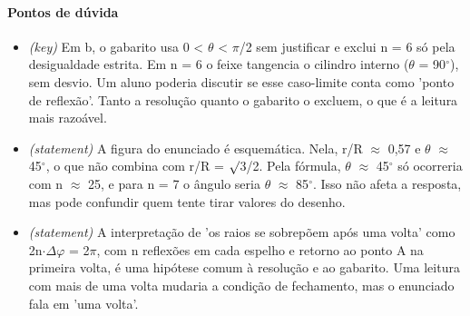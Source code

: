 \documentclass{article}%
\begin{document}
\paragraph{Pontos de dúvida}%
\begin{itemize}%
\item%
\textit{(key)} Em b, o gabarito usa 0 < $\theta$ < $\pi$/2 sem justificar e exclui n = 6 só pela desigualdade estrita. Em n = 6 o feixe tangencia o cilindro interno ($\theta$ = 90$^\circ$), sem desvio. Um aluno poderia discutir se esse caso{-}limite conta como 'ponto de reflexão'. Tanto a resolução quanto o gabarito o excluem, o que é a leitura mais razoável.%
\item%
\textit{(statement)} A figura do enunciado é esquemática. Nela, r/R $\approx$ 0,57 e $\theta$ $\approx$ 45$^\circ$, o que não combina com r/R = $\surd$3/2. Pela fórmula, $\theta$ $\approx$ 45$^\circ$ só ocorreria com n $\approx$ 25, e para n = 7 o ângulo seria $\theta$ $\approx$ 85$^\circ$. Isso não afeta a resposta, mas pode confundir quem tente tirar valores do desenho.%
\item%
\textit{(statement)} A interpretação de 'os raios se sobrepõem após uma volta' como 2n$\cdot$$\Delta$$\varphi$ = 2$\pi$, com n reflexões em cada espelho e retorno ao ponto A na primeira volta, é uma hipótese comum à resolução e ao gabarito. Uma leitura com mais de uma volta mudaria a condição de fechamento, mas o enunciado fala em 'uma volta'.%
\end{itemize}%
\end{document}
